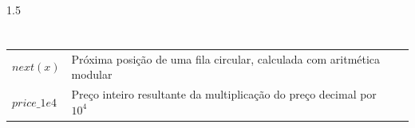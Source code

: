 \begin{Spacing}{1.5}
\section*{\nomenotacoes}
\begin{tabularx}{\textwidth}{@{}lXr@{}}
$next(x)$ & Próxima posição de uma fila circular, calculada com aritmética modular & \\
$price\_1e4$ & Preço inteiro resultante da multiplicação do preço decimal por $10^4$ & \\
\end{tabularx}
\end{Spacing}
